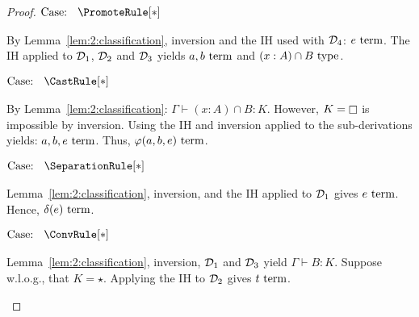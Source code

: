 \begin{proof}
    $\text{Case: }\begin{array}{c} \PromoteRule[*] \end{array}$
    \begin{proofcase}
        By Lemma~\ref{lem:2:classification}, inversion and the IH used with $\mathcal{D}_{4}$: $e~\textnormal{term}$.
        The IH applied to $\mathcal{D}_{1}$, $\mathcal{D}_{2}$ and $\mathcal{D}_{3}$ yields $a, b~\textnormal{term}$ and $(x : A) \cap B~\textnormal{type}$.
    \end{proofcase}

    $\text{Case: }\begin{array}{c} \CastRule[*] \end{array}$
    \begin{proofcase}
        By Lemma~\ref{lem:2:classification}: $\Gamma \vdash (x : A) \cap B : K$.
        However, $K = \kind$ is impossible by inversion.
        Using the IH and inversion applied to the sub-derivations yields: $a, b, e~\textnormal{term}$.
        Thus, $\varphi(a, b, e)~\textnormal{term}$.
    \end{proofcase}

    $\text{Case: }\begin{array}{c} \SeparationRule[*] \end{array}$
    \begin{proofcase}
        Lemma~\ref{lem:2:classification}, inversion, and the IH applied to $\mathcal{D}_{1}$ gives $e~\textnormal{term}$.
        Hence, $\delta(e)~\textnormal{term}$.
    \end{proofcase}

    $\text{Case: }\begin{array}{c} \ConvRule[*] \end{array}$
    \begin{proofcase}
        Lemma~\ref{lem:2:classification}, inversion, $\mathcal{D}_{1}$ and $\mathcal{D}_{3}$ yield $\Gamma \vdash B : K$.
        Suppose w.l.o.g., that $K = \star$.
        Applying the IH to $\mathcal{D}_{2}$ gives $t~\textnormal{term}$.
    \end{proofcase}
\end{proof}
